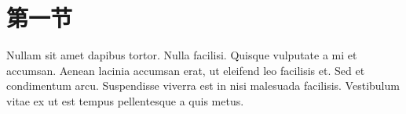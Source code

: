 \documentclass[float=false, crop=false]{standalone}
\begin{document}
    
    \section{第一节}
    Nullam sit amet dapibus tortor.
Nulla facilisi. Quisque vulputate a mi et accumsan.
Aenean lacinia accumsan erat, ut eleifend leo facilisis et.
Sed et condimentum arcu.
Suspendisse viverra est in nisi malesuada facilisis.
Vestibulum vitae ex ut est tempus pellentesque a quis metus.
\end{document}
